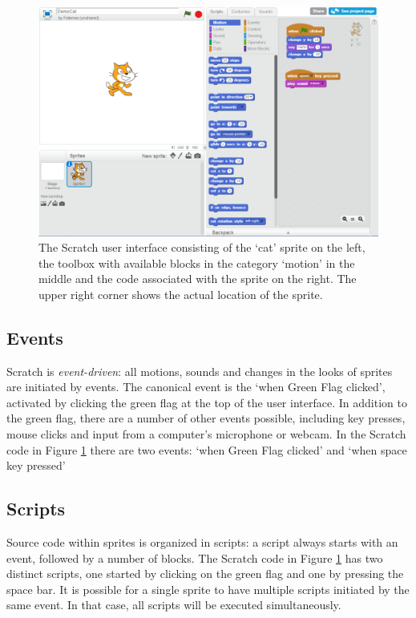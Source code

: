 \documentclass[conference]{IEEEtran}
\begin{document}
\begin{figure}
  \begin{center}
  \includegraphics[width=\columnwidth]{fig/ui.png}
  \caption{The Scratch user interface consisting of the `cat' sprite on the left, the toolbox with available blocks in the category `motion' in the middle and the code associated with the sprite on the right. The upper right corner shows the actual location of the sprite.}
  \label{fig:ui}
  \end{center}
\end{figure} 

\subsection{Events}
Scratch is \emph{event-driven}: all motions, sounds and changes in the looks of sprites are initiated by events. The canonical event is the `when Green Flag clicked', activated by clicking the green flag at the top of the user interface. In addition to the green flag, there are a number of other events possible, including key presses, mouse clicks and input from a computer's microphone or webcam. In the Scratch code in Figure \ref{fig:ui} there are two events: `when Green Flag clicked' and `when space key pressed'

\subsection{Scripts}
Source code within sprites is organized in scripts: a script always starts with an event, followed by a number of blocks. The Scratch code in Figure \ref{fig:ui} has two distinct scripts, one started by clicking on the green flag and one by pressing the space bar. It is possible for a single sprite to have multiple scripts initiated by the same event. In that case, all scripts will be executed simultaneously. 
\end{document}
